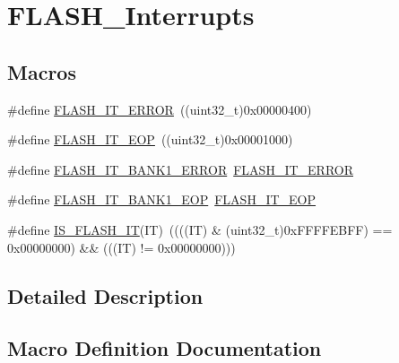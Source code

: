 \hypertarget{group___f_l_a_s_h___interrupts}{}\section{F\+L\+A\+S\+H\+\_\+\+Interrupts}
\label{group___f_l_a_s_h___interrupts}
\subsection*{Macros}
\begin{DoxyCompactItemize}
\item 
\#define \mbox{\hyperlink{group___f_l_a_s_h___interrupts_ga61c74493d4c1f36ddaf563719d446a7d}{F\+L\+A\+S\+H\+\_\+\+I\+T\+\_\+\+E\+R\+R\+OR}}~((uint32\+\_\+t)0x00000400)
\item 
\#define \mbox{\hyperlink{group___f_l_a_s_h___interrupts_gaea20e80e1806d58a7544cfe8659e7f11}{F\+L\+A\+S\+H\+\_\+\+I\+T\+\_\+\+E\+OP}}~((uint32\+\_\+t)0x00001000)
\item 
\#define \mbox{\hyperlink{group___f_l_a_s_h___interrupts_ga808627239be1bf9c2d8bfed36ec4db19}{F\+L\+A\+S\+H\+\_\+\+I\+T\+\_\+\+B\+A\+N\+K1\+\_\+\+E\+R\+R\+OR}}~\mbox{\hyperlink{group___f_l_a_s_h___interrupts_ga61c74493d4c1f36ddaf563719d446a7d}{F\+L\+A\+S\+H\+\_\+\+I\+T\+\_\+\+E\+R\+R\+OR}}
\item 
\#define \mbox{\hyperlink{group___f_l_a_s_h___interrupts_gac8825e2ce2c0e6ca63a40a347bd351a9}{F\+L\+A\+S\+H\+\_\+\+I\+T\+\_\+\+B\+A\+N\+K1\+\_\+\+E\+OP}}~\mbox{\hyperlink{group___f_l_a_s_h___interrupts_gaea20e80e1806d58a7544cfe8659e7f11}{F\+L\+A\+S\+H\+\_\+\+I\+T\+\_\+\+E\+OP}}
\item 
\#define \mbox{\hyperlink{group___f_l_a_s_h___interrupts_ga46ee77d0be1f3e0a14ded0651163ae11}{I\+S\+\_\+\+F\+L\+A\+S\+H\+\_\+\+IT}}(IT)~((((IT) \& (uint32\+\_\+t)0x\+F\+F\+F\+F\+E\+B\+F\+F) == 0x00000000) \&\& (((\+I\+T) != 0x00000000)))
\end{DoxyCompactItemize}


\subsection{Detailed Description}


\subsection{Macro Definition Documentation}
\mbox{\label{group___f_l_a_s_h___interrupts_gac8825e2ce2c0e6ca63a40a347bd351a9}} 
